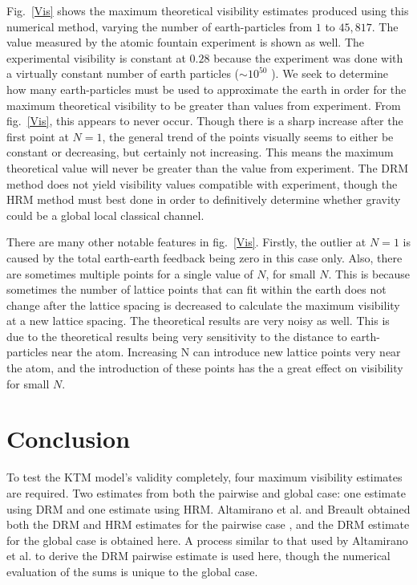 \documentclass[aps, prd, superscriptaddress,twocolumn,amsmath,amssymb,nofootinbib]{revtex4-1}
\begin{document}
 Fig.~\ref{Vis} shows the maximum theoretical visibility estimates produced using this numerical method, varying the number of earth-particles from $1$ to $45,817$. The value measured by the atomic fountain experiment is shown as well. The experimental visibility is constant at $0.28$ because the experiment was done with a virtually constant number of earth particles ($\sim 10^{50}$ \cite{site}). We seek to determine how many earth-particles must be used to approximate the earth in order for the maximum theoretical visibility to be greater than values from experiment. From fig.~\ref{Vis}, this appears to never occur. Though there is a sharp increase after the first point at $N=1$, the general trend of the points visually seems to either be constant or decreasing, but certainly not increasing. This means the maximum theoretical value will never be greater than the value from experiment. The DRM method does not yield visibility values compatible with experiment, though the HRM method must best done in order to definitively determine whether gravity could be a global local classical channel.

There are many other notable features in fig.~\ref{Vis}. Firstly, the outlier at $N=1$ is caused by the total earth-earth feedback being zero in this case only. Also, there are sometimes multiple points for a single value of $N$, for small $N$. This is because sometimes the number of lattice points that can fit within the earth does not change after the lattice spacing is decreased to calculate the maximum visibility at a new lattice spacing. The theoretical results are very noisy as well. This is due to the theoretical results being very sensitivity to the distance to earth-particles near the atom. Increasing N can introduce new lattice points very near the atom, and the introduction of these points has the a great effect on visibility for small $N$.


\pagebreak[4]
\section{Conclusion}
To test the KTM model's validity completely, four maximum visibility estimates are required. Two estimates from both the pairwise and global case: one estimate using DRM and one estimate using HRM. Altamirano et al. and Breault obtained both the DRM and HRM estimates for the pairwise case \cite{P3, breault}, and the DRM estimate for the global case is obtained here. A process similar to that used by Altamirano et al. to derive the DRM pairwise estimate is used here, though the numerical evaluation of the sums is unique to the global case.
\end{document}

